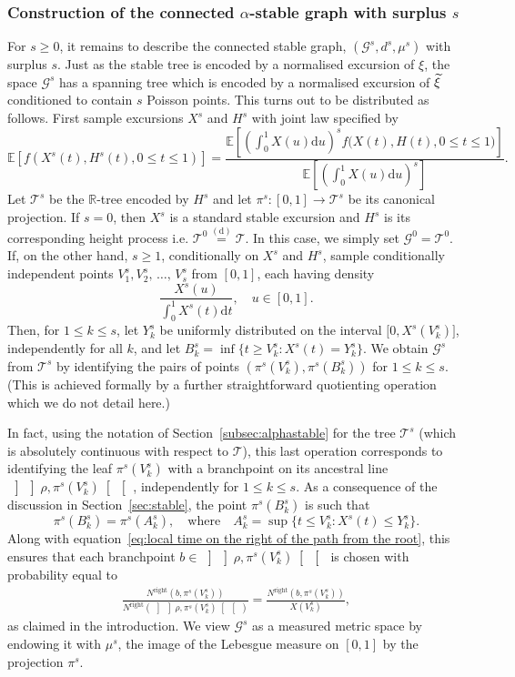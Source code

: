 \documentclass[10pt]{amsart}
\theoremstyle{definition}\newtheorem{defi}[theo]{Definition}\newtheorem{rema}[theo]{Remark}\newtheorem{exam}[theo]{Example}\newtheorem{exem}[theo]{Example}\newtheorem{nota}[theo]{Notation}
\newcommand{\intervalle}[4]{\mathopen{#1}#2
\mathclose{}\mathpunct{},#3
\mathclose{#4}}
\newcommand{\intervalleff}[2]{\intervalle{[}{#1}{#2}{]}}
\newcommand{\E}[1]{\ensuremath{\mathbb{E} \left[#1 \right]}}
\newcommand{\equidist}{\ensuremath{\stackrel{\mathrm{(d)}}{=}}}
\newcommand{\oseg}[2]{\, \left] \! \left] #1, #2 \right[\! \right[\,}
\newcommand{\Rightll}{\mathrm{right}}
\newcommand{\rmd}{\mathrm{d}}
\newcommand{\cG}{\mathcal{G}}
\newcommand{\cT}{\mathcal{T}}
\newcommand{\R}{\mathbb{R}}
\let\oldtilde\tilde
\renewcommand*{\tilde}[1]{\mathchoice{\widetilde{#1}}{\widetilde{#1}}{\oldtilde{#1}}{\oldtilde{#1}}}
\begin{document}
\subsubsection{Construction of the connected $\alpha$-stable graph with surplus $s$}
For $s \ge 0$, it remains to describe the connected stable graph, $(\cG^s, d^s, \mu^s)$ with surplus $s$. Just as the stable tree is encoded by a normalised excursion of $\xi$, the space $\cG^s$ has a spanning tree which is encoded by a normalised excursion of $\tilde{\xi}$ conditioned to contain $s$ Poisson points. This turns out to be distributed as follows. First sample excursions $X^s$ and $H^s$ with joint law specified by
\[
\E{f\left(X^s(t), H^s(t), 0 \le t \le 1\right)} = \frac{\E{\left(\int_0^{1} X(u) \rmd u \right)^s f\big(X(t), H(t), 0 \le t \le 1\big)}}{\E{\left(\int_0^{1} X(u) \rmd u \right)^s}}.
\]
Let $\cT^s$ be the $\R$-tree encoded by $H^s$ and let $\pi^s: [0,1] \to \cT^s$ be its canonical projection. If $s = 0$, then $X^s$ is a standard stable excursion and $H^s$ is its corresponding height process i.e. $\cT^0 \equidist \cT$. In this case, we simply set $\cG^0 = \cT^0$. If, on the other hand, $s \ge 1$, conditionally on $X^s$ and $H^s$, sample conditionally independent points $V^s_1, V^s_2, \,\ldots,\,V^s_s$ from $[0,1]$, each having density
\[
\frac{X^s(u)}{\int_0^1 X^s(t) \rmd t}, \quad u \in [0,1].
\]
Then, for $1 \le k \le s$, let $Y^s_{k}$ be uniformly distributed on the interval $\intervalleff{0}{X^s(V^s_k)}$, independently for all $k$, and let $B^s_{k} = \inf \{t \ge V^s_{k}: X^s(t) = Y^s_{k} \}$. We obtain $\cG^s$ from $\cT^s$ by identifying the pairs of points $(\pi^s(V^s_k), \pi^s(B^s_k))$ for $1 \le k \le s$. (This is achieved formally by a further straightforward quotienting operation which we do not detail here.)

In fact, using the notation of Section~\ref{subsec:alphastable} for the tree $\cT^s$ (which is absolutely continuous with respect to $\cT$), this last operation corresponds to identifying the leaf $\pi^s(V^s_k)$ with a branchpoint on its ancestral line $\oseg{\rho}{\pi^s(V^s_k)}$, independently for $1\leq k \leq s$. As a consequence of the discussion in Section~\ref{sec:stable}, the point $\pi^s(B_k^s)$ is such that
\[
\pi^s\left(B^s_k\right)=\pi^s\left(A^s_k\right), \quad \text{where} \quad A^s_{k} = \sup \Big\{t \le V^s_{k}: X^s(t) \leq Y_k^s \Big\}.
\]
Along with equation~\eqref{eq:local time on the right of the path from the root}, this ensures that each branchpoint $b\in \oseg{\rho}{\pi^s(V^s_k)}$ is chosen with probability equal to
\begin{align*}
\frac{N^{\Rightll}\left(b,\pi^s\left(V^s_k\right)\right)}{N^{\Rightll}\left(\oseg{\rho}{\pi^s\left(V^s_k\right)}\right)}= \frac{N^{\Rightll}\left(b,\pi^s\left(V^s_k\right)\right)}{X\left(V^s_k\right)},
\end{align*}
as claimed in the introduction. We view $\cG^s$ as a measured metric space by endowing it with $\mu^s$, the image of the Lebesgue measure on $[0,1]$ by the projection $\pi^s$.
\end{document}

